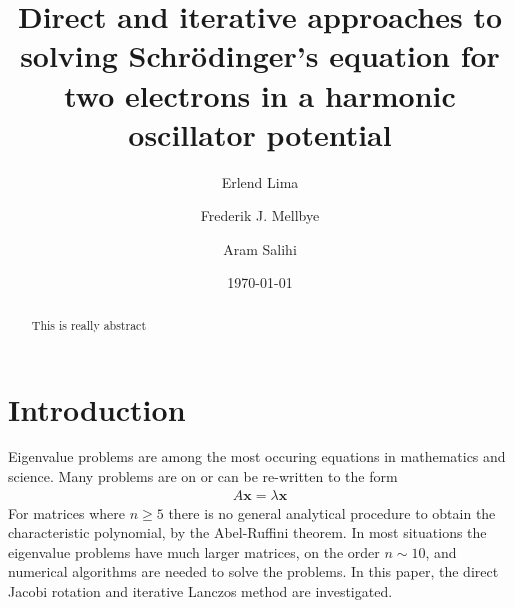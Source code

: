 \documentclass[aps,reprint]{revtex4-1}
\begin{document}
\title{Direct and iterative approaches to solving Schrödinger's equation for
two electrons in a harmonic oscillator potential}
\author{Erlend Lima}
\author{Frederik J. Mellbye}
\author{Aram Salihi}
\date{\today}

\begin{abstract}
  This is really abstract
\end{abstract}
\maketitle
\tableofcontents
\makeatletter
\let\toc@pre\relax
\let\toc@post\relax
\makeatother

\newpage

%
%
\section{Introduction}
\label{sec:introduction}
Eigenvalue problems are among the most occuring equations in
mathematics and science. Many problems are on or can be re-written to the
form
\begin{align*}
  A \mathbf{x} = \lambda \mathbf{x}
\end{align*}
For matrices where $n \geq 5$ there is
no general analytical procedure to obtain the characteristic polynomial, by the
Abel-Ruffini theorem. In most situations the eigenvalue problems have much
larger matrices, on the order \(n\sim 10\), and numerical algorithms are needed to solve the problems. In
this paper, the direct Jacobi rotation and iterative Lanczos method
are investigated.
\end{document}
